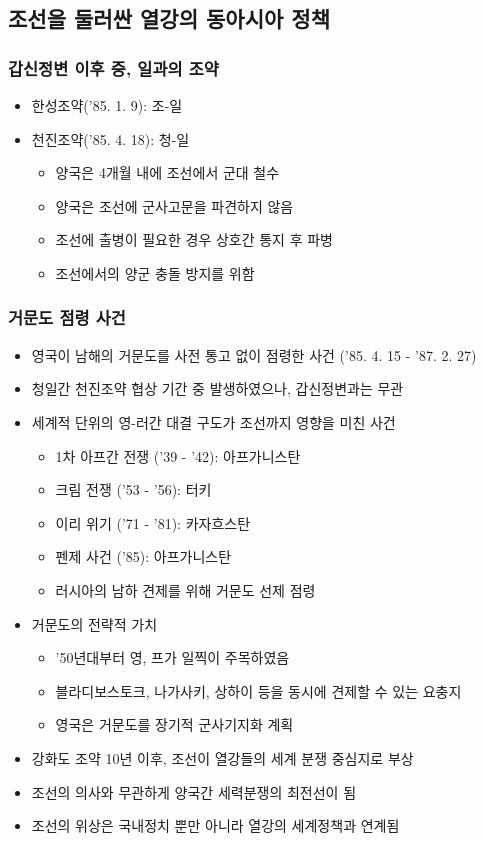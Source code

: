 \subsection{조선을 둘러싼 열강의 동아시아 정책}

\subsubsection*{갑신정변 이후 중, 일과의 조약}
\begin{itemize}
    \item 한성조약('85. 1. 9): 조-일
    \item 천진조약('85. 4. 18): 청-일
    \begin{itemize}
        \item 양국은 4개월 내에 조선에서 군대 철수
        \item 양국은 조선에 군사고문을 파견하지 않음
        \item 조선에 출병이 필요한 경우 상호간 통지 후 파병
        \item 조선에서의 양군 충돌 방지를 위함
    \end{itemize}
\end{itemize}

\subsubsection*{거문도 점령 사건}
\begin{itemize}
    \item 영국이 남해의 거문도를 사전 통고 없이 점령한 사건 ('85. 4. 15 - '87. 2. 27)
    \item 청일간 천진조약 협상 기간 중 발생하였으나, 갑신정변과는 무관
    \item 세계적 단위의 영-러간 대결 구도가 조선까지 영향을 미친 사건
    \begin{itemize}
        \item 1차 아프간 전쟁 ('39 - '42): 아프가니스탄
        \item 크림 전쟁 ('53 - '56): 터키
        \item 이리 위기 ('71 - '81): 카자흐스탄
        \item 펜제 사건 ('85): 아프가니스탄
        \item 러시아의 남하 견제를 위해 거문도 선제 점령
    \end{itemize}
    \item 거문도의 전략적 가치
    \begin{itemize}
        \item '50년대부터 영, 프가 일찍이 주목하였음
        \item 블라디보스토크, 나가사키, 상하이 등을 동시에 견제할 수 있는 요충지
        \item 영국은 거문도를 장기적 군사기지화 계획
    \end{itemize}
    \item 강화도 조약 10년 이후, 조선이 열강들의 세계 분쟁 중심지로 부상
    \item 조선의 의사와 무관하게 양국간 세력분쟁의 최전선이 됨
    \item 조선의 위상은 국내정치 뿐만 아니라 열강의 세계정책과 연계됨
\end{itemize}

